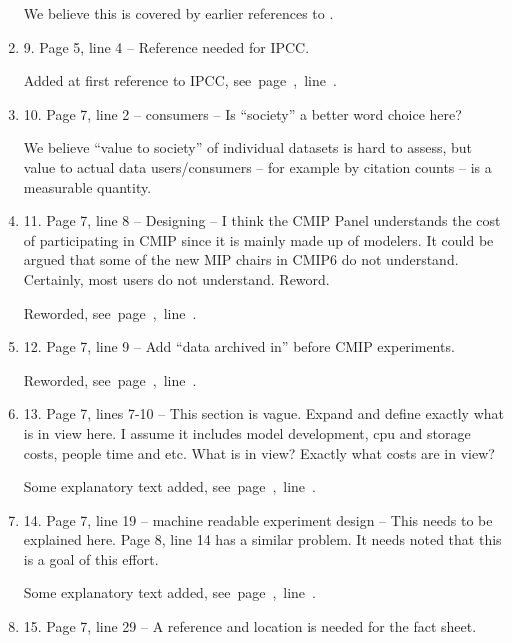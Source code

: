 \documentclass[gmd,manuscript]{copernicus}
\newcommand{\plref}[1]{\mbox{see page \pageref{p-#1}, line
    \lineref{l-#1}.}}
\newenvironment{answer}{\color{blue}}{}
\begin{document}
\begin{enumerate}[label=RC1-\arabic*,leftmargin=*]
  \begin{answer}
    We believe this is covered by earlier references to
    \cite{ref:eyringetal2016a}.
  \end{answer}
\item 9. Page 5, line 4 -- Reference needed for IPCC.

  \begin{answer}
    Added at first reference to IPCC, \plref{RC1-9}
  \end{answer}
\item 10. Page 7, line 2 -- consumers -- Is “society” a better word
  choice here?

  \begin{answer}
    We believe ``value to society'' of individual datasets is hard to
    assess, but value to actual data users/consumers -- for example by
    citation counts -- is a measurable quantity.
  \end{answer}
  
\item 11. Page 7, line 8 -- Designing -- I think the CMIP Panel
  understands the cost of participating in CMIP since it is mainly
  made up of modelers. It could be argued that some of the new MIP
  chairs in CMIP6 do not understand. Certainly, most users do not
  understand. Reword.

  \begin{answer}
    Reworded, \plref{RC1-11}
  \end{answer}
\item 12. Page 7, line 9 -- Add “data archived in” before CMIP
  experiments.

  \begin{answer}
    Reworded, \plref{RC1-12}
  \end{answer}
\item 13. Page 7, lines 7-10 -- This section is vague. Expand and
  define exactly what is in view here. I assume it includes model
  development, cpu and storage costs, people time and etc. What is in
  view? Exactly what costs are in view?

  \begin{answer}
    Some explanatory text added, \plref{RC1-13}
  \end{answer}
\item 14. Page 7, line 19 -- machine readable experiment design -- This
  needs to be explained here. Page 8, line 14 has a similar problem.
  It needs noted that this is a goal of this effort.

  \begin{answer}
    Some explanatory text added, \plref{RC1-14}
  \end{answer}
\item 15. Page 7, line 29 -- A reference and location is needed for the
  fact sheet.


\end{enumerate}
\end{document}
